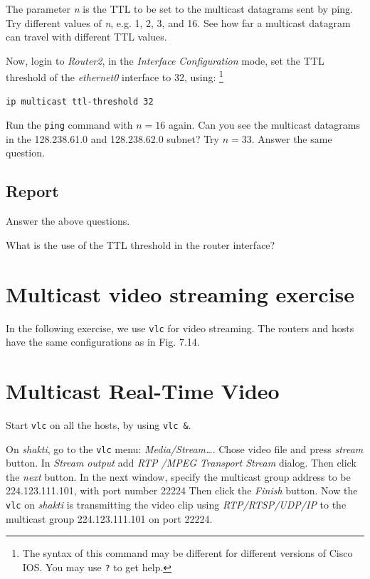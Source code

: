 \documentclass{../UTNetLab}
\begin{document}
    The parameter \textit{n} is the TTL to be set to the multicast datagrams sent by ping.
    Try different values of \textit{n}, e.g. 1, 2, 3, and 16.
    See how far a multicast datagram can travel with different TTL values. 

    Now, login to \textit{Router2}, in the \textit{Interface Configuration} mode, set the TTL threshold of the \textit{ethernet0} interface to 32, using: 
    \footnote{The syntax of this command may be different for different versions of Cisco IOS. You may use \lstinline[language={cisco}]{?} to get help.}
    \begin{lstlisting}[language={cisco}]    
ip multicast ttl-threshold 32
    \end{lstlisting}

    Run the \lstinline{ping} command with $n = 16$ again.
    Can you see the multicast datagrams in the 128.238.61.0 and 128.238.62.0 subnet?
    Try $n = 33$.
    Answer the same question.
    
    \subsection*{Report}
    Answer the above questions. 

    What is the use of the TTL threshold in the router interface?

\section*{Multicast video streaming exercise}
    In the following exercise, we use \lstinline{vlc} for video streaming.
    The routers and hosts have the same configurations as in Fig. 7.14.

\section{Multicast Real-Time Video}
    Start \lstinline{vlc} on all the hosts, by using \lstinline{vlc &}. 

    On \textit{shakti}, go to the \lstinline{vlc} menu: \textit{Media/Stream\ldots }. Chose video file  and press \textit{stream} button. In \textit{Stream output} add \textit{RTP /MPEG Transport Stream} dialog.
    Then click the \textit{next} button.
    In the next window, specify the multicast group address to be {224.123.111.101}, with port number {22224} %
    Then click the \textit{Finish} button.
    Now the \lstinline{vlc} on \textit{shakti} is transmitting the video clip using \textit{RTP/RTSP/UDP/IP} to the multicast group {224.123.111.101} on port {22224}. 
\end{document}

